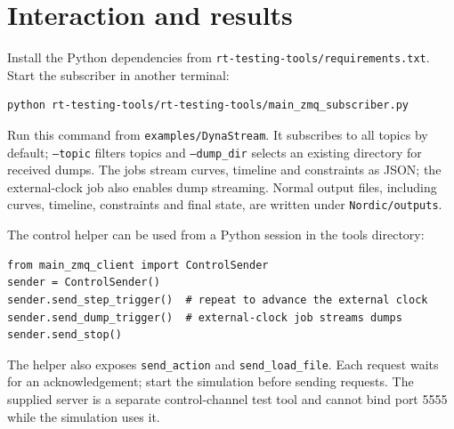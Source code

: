 \documentclass[a4paper, 12pt]{report}
\begin{document}
\section{Interaction and results}
Install the Python dependencies from \texttt{rt-testing-tools/requirements.txt}. Start the subscriber in another terminal:
\begin{verbatim}
python rt-testing-tools/rt-testing-tools/main_zmq_subscriber.py
\end{verbatim}
Run this command from \texttt{examples/DynaStream}. It subscribes to all topics by default; \texttt{--topic} filters topics and \texttt{--dump\_dir} selects an existing directory for received dumps. The jobs stream curves, timeline and constraints as JSON; the external-clock job also enables dump streaming. Normal output files, including curves, timeline, constraints and final state, are written under \texttt{Nordic/outputs}.

The control helper can be used from a Python session in the tools directory:
\begin{verbatim}
from main_zmq_client import ControlSender
sender = ControlSender()
sender.send_step_trigger()  # repeat to advance the external clock
sender.send_dump_trigger()  # external-clock job streams dumps
sender.send_stop()
\end{verbatim}
The helper also exposes \texttt{send\_action} and \texttt{send\_load\_file}. Each request waits for an acknowledgement; start the simulation before sending requests. The supplied server is a separate control-channel test tool and cannot bind port 5555 while the simulation uses it.
\end{document}
